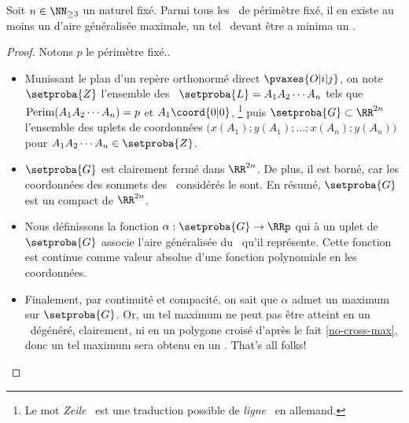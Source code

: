 

\begin{fact} \label{suff-cond}
    Soit $n \in \NN_{\geq3}$ un naturel fixé.
    Parmi tous les \ncycles\ de périmètre fixé, il en existe au moins un d'aire généralisée maximale, un tel \ncycle\ devant être a minima un \ngone.
\end{fact}


\begin{proof}
	Notons $p$ le périmètre fixé..
    \begin{itemize}
        \item Munissant le plan d'un repère orthonormé direct $\pvaxes{O | i | j}$, on note $\setproba{Z}$ l'ensemble des \ncycles\ $\setproba{L} = A_1 A_2 \cdots A_n$ tels que
        $\mathrm{Perim}(A_1 A_2 \cdots A_n) = p$
        et
        $A_1\coord{0 | 0}$,%
        \footnote{
        	Le mot \og \emph{Zeile} \fg\ est une traduction possible de \og \emph{ligne} \fg\ en allemand.
        }
        puis $\setproba{G} \subset \RR^{2n}$ l'ensemble des uplets de coordonnées $\big( x(A_1) ; y(A_1) ; \dots ; x(A_n) ; y(A_n) \big)$ pour $A_1 A_2 \cdots A_n \in \setproba{Z}$.


        \item $\setproba{G}$ est clairement fermé dans $\RR^{2n}$.
        De plus, il est borné, car les coordonnées des sommets des \ncycles\ considérés le sont.
        En résumé, $\setproba{G}$ est un compact de $\RR^{2n}$.


        \item Nous définissons la fonction $\alpha: \setproba{G} \rightarrow \RRp$ qui à un uplet de $\setproba{G}$ associe l'aire généralisée du \ncycle\ qu'il représente.
        Cette fonction est continue comme valeur absolue d'une fonction polynomiale en les coordonnées.


        \item Finalement, par continuité et compacité, on sait que $\alpha$ admet un maximum sur $\setproba{G}$.
        Or, un tel maximum ne peut pas être atteint en un \ncycle\ dégénéré, clairement, ni en un polygone croisé d'après le fait \ref{no-cross-max}, donc un tel maximum sera obtenu en un \ngone. That's all folks!
    \end{itemize}
\end{proof}
